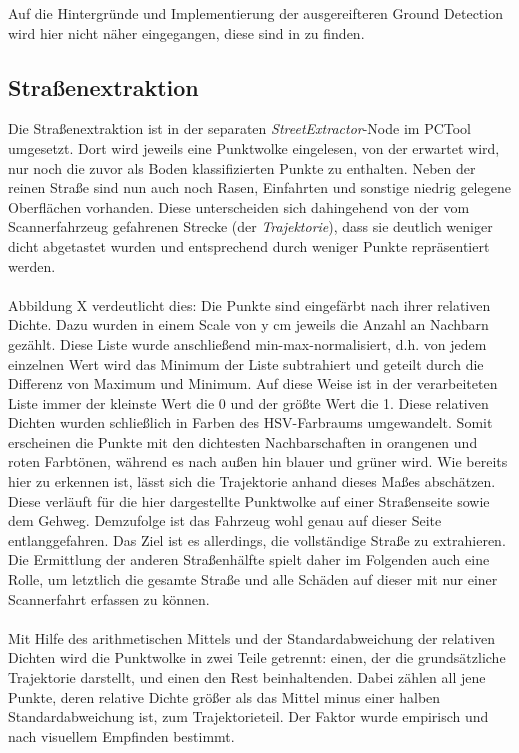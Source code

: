 Auf die Hintergründe und Implementierung der ausgereifteren Ground Detection wird hier nicht näher eingegangen, diese sind in \cite{Mattes-2021} zu finden.

\subsection{Straßenextraktion}

Die Straßenextraktion ist in der separaten \textit{StreetExtractor}-Node im PCTool umgesetzt. Dort wird jeweils eine Punktwolke eingelesen, von der erwartet wird, nur noch die zuvor als Boden klassifizierten Punkte zu enthalten. Neben der reinen Straße sind nun auch noch Rasen, Einfahrten und sonstige niedrig gelegene Oberflächen vorhanden. Diese unterscheiden sich dahingehend von der vom Scannerfahrzeug gefahrenen Strecke (der \textit{Trajektorie}), dass sie deutlich weniger dicht abgetastet wurden und entsprechend durch weniger Punkte repräsentiert werden. \\\\
Abbildung X verdeutlicht dies: Die Punkte sind eingefärbt nach ihrer relativen Dichte. Dazu wurden in einem Scale von y cm jeweils die Anzahl an Nachbarn gezählt. Diese Liste wurde anschließend min-max-normalisiert, d.h. von jedem einzelnen Wert wird das Minimum der Liste subtrahiert und geteilt durch die Differenz von Maximum und Minimum. Auf diese Weise ist in der verarbeiteten Liste immer der kleinste Wert die 0 und der größte Wert die 1. Diese relativen Dichten wurden schließlich in Farben des HSV-Farbraums umgewandelt. Somit erscheinen die Punkte mit den dichtesten Nachbarschaften in orangenen und roten Farbtönen, während es nach außen hin blauer und grüner wird. Wie bereits hier zu erkennen ist, lässt sich die Trajektorie anhand dieses Maßes abschätzen. Diese verläuft für die hier dargestellte Punktwolke auf einer Straßenseite sowie dem Gehweg. Demzufolge ist das Fahrzeug wohl genau auf dieser Seite entlanggefahren. Das Ziel ist es allerdings, die vollständige Straße zu extrahieren. Die Ermittlung der anderen Straßenhälfte spielt daher im Folgenden auch eine Rolle, um letztlich die gesamte Straße und alle Schäden auf dieser mit nur einer Scannerfahrt erfassen zu können. \\\\
Mit Hilfe des arithmetischen Mittels und der Standardabweichung der relativen Dichten wird die Punktwolke in zwei Teile getrennt: einen, der die grundsätzliche Trajektorie darstellt, und einen den Rest beinhaltenden. Dabei zählen all jene Punkte, deren relative Dichte größer als das Mittel minus einer halben Standardabweichung ist, zum Trajektorieteil. Der Faktor wurde empirisch und nach visuellem Empfinden bestimmt. \\

